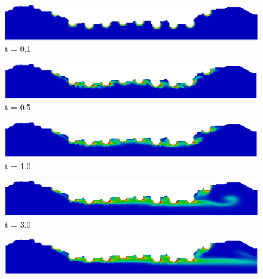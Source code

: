 \begin{figure}[H]
     \begin{minipage}{.50\linewidth}
      \centering
      \includegraphics[scale=0.18]{./02_chaps/cap_solution/figure/conc100_RealStrut1.png}\\
      t = 0.1
     \end{minipage}%
     \begin{minipage}{.50\linewidth}
      \centering
      \includegraphics[scale=0.18]{./02_chaps/cap_solution/figure/conc100_RealStrut2.png}\\
      t = 0.5
     \end{minipage}
     \begin{minipage}{.50\linewidth}
     \medskip
      \centering
      \includegraphics[scale=0.18]{./02_chaps/cap_solution/figure/conc100_RealStrut3.png}\\
      t = 1.0
     \end{minipage}%
     \begin{minipage}{.50\linewidth}
     \medskip
      \centering
      \includegraphics[scale=0.18]{./02_chaps/cap_solution/figure/conc100_RealStrut4.png}\\
      t = 3.0
     \end{minipage}
     \begin{minipage}{.50\linewidth}
      \centering
      \includegraphics[scale=0.18]{./02_chaps/cap_solution/figure/conc100_RealStrut5.png}\\

\end{minipage}
\end{figure}
